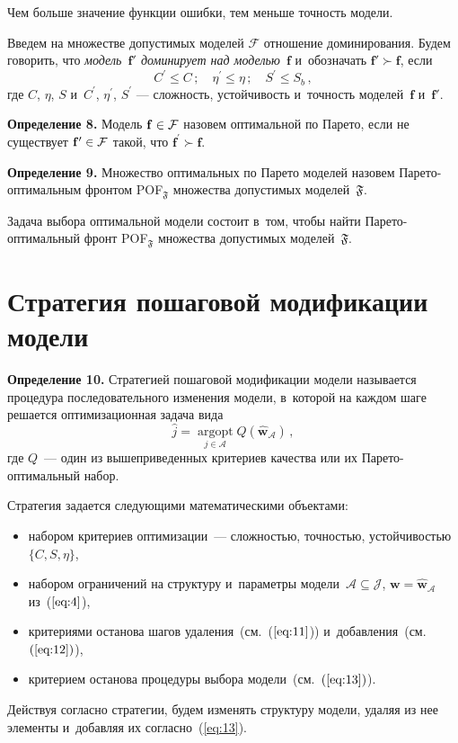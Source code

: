 \begin{multicols}{2}
\smallskip

Чем больше значение функции ошибки, тем меньше точность модели.

Введем на множестве допустимых моделей $\mathcal{F}$ отношение
доминирования. Будем говорить, что \textit{модель~$\mathbf{f}'$ доминирует
над моделью~$\mathbf{f}$} и~обозначать $\mathbf{f}' \succ \mathbf{f}$, если
\begin{equation*}
C^\prime \leq C\,; \quad \eta^\prime \leq \eta\,;\quad S^\prime \leq S_b\,,
\end{equation*}
где $C$, $\eta$, $S$ и~$C^\prime$, $\eta^\prime$, $S^\prime$ --- сложность,
устойчивость и~точность
моделей~$\mathbf{f}$ и~$\mathbf{f}'$.

\smallskip

\noindent
\textbf{Определение 8.}
Модель $\mathbf{f} \hm\in \mathcal{F}$ назовем оптимальной по Парето, если
не существует $\mathbf{f^\prime}\hm \in \mathcal{F}$ такой,
что $\mathbf{f^\prime} \succ \mathbf{f}$.

\smallskip

\noindent
\textbf{Определение 9.}
Множество оптимальных по Парето моделей назовем Па\-ре\-то-опти\-маль\-ным
фронтом {POF}$_{\mathfrak{F}}$ множества допустимых моделей~$\mathfrak{F}$.


\smallskip

Задача выбора оптимальной модели состоит в~том, чтобы найти
Па\-ре\-то-опти\-маль\-ный фронт {POF}$_{\mathfrak{F}}$ множества
допустимых моделей~$\mathfrak{F}$.

\section{Стратегия пошаговой модификации модели}

\noindent
\textbf{Определение 10.}
Стратегией пошаговой модификации модели называется процедура
последовательного изменения модели, в~которой на каж\-дом шаге решается
оптимизационная задача вида
\begin{equation*}
\hat{j} = \mathop{\arg \text{opt}}\limits_{{j \in \mathcal{A}}}Q
(\mathbf{\hat{w}}_\mathcal{A})\,,
\end{equation*}
где $Q$~--- один из вышеприведенных критериев качества или их
Па\-ре\-то-опти\-маль\-ный набор.

\smallskip

Стратегия задается следующими математическими объектами:
\begin{itemize}
\item набором критериев оптимизации~--- слож\-ностью, точ\-ностью, устойчивостью $\{C, S, \eta\}$,
\item набором ограничений на структуру и~па\-ра\-мет\-ры
модели~$\mathcal{A} \subseteq \mathcal{J}$,
$\mathbf{w} = \mathbf{\hat{w}}_{\mathcal{A}}$ из~($\ref{eq:4}$),
\item критериями останова шагов удаления~(см.\ ($\ref{eq:11}$))
и~добавления~(см.\ $(\ref{eq:12})$),
\item критерием останова процедуры выбора модели~(см.\ $(\ref{eq:13})$).
\end{itemize}
Действуя согласно стратегии, будем изменять структуру модели, удаляя
из нее элементы и~добавляя их согласно~(\ref{eq:13}).


\end{multicols}
